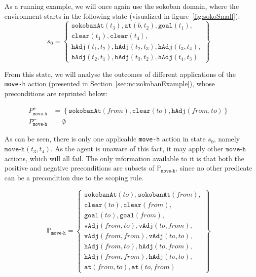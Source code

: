 \documentclass[../Master.tex]{subfiles}
\begin{document}
\begin{example}\label{ex:ncp:sokobanSetup}
    As a running example, we will once again use the sokoban domain, where the environment starts in the following state (visualized in figure~\ref{fig:sokoSmall}):
    \begin{equation*}
        s_0 =
        \left\{
            \begin{gathered}
                \texttt{sokobanAt}(t_3), \texttt{at}(b, t_2), \texttt{goal}(t_1), \\
                \texttt{clear}(t_1), \texttt{clear}(t_4), \\
                \texttt{hAdj}(t_1, t_2), \texttt{hAdj}(t_2, t_3),
                \texttt{hAdj}(t_3, t_4), \\
                \texttt{hAdj}(t_2, t_1), \texttt{hAdj}(t_3, t_2),
                \texttt{hAdj}(t_4, t_3)
            \end{gathered}
        \right\}
    \end{equation*}

    From this state, we will analyse the outcomes of different applications of the \texttt{move-h} action (presented in Section~\ref{sec:nc:sokobanExample}), whose preconditions are reprinted below:

    \begin{align*}
        P_{\texttt{move-h}}^+ &= \left\{
            \texttt{sokobanAt}(from), \texttt{clear}(to), \texttt{hAdj}(from, to)
            \right\} \\
        P_{\texttt{move-h}}^- &= \emptyset
    \end{align*}

    As can be seen, there is only one applicable \texttt{move-h} action in state $s_0$, namely $\texttt{move-h}(t_3,t_4)$. As the agent is unaware of this fact, it may apply other $\texttt{move-h}$ actions, which will all fail. The only information available to it is that both the positive and negative preconditions are subsets of $\mathbb{P}_{\texttt{move-h}}$, since no other predicate can be a precondition due to the scoping rule.

    \begin{equation*}
    \mathbb{P}_{\texttt{move-h}} =
    \left\{
        \begin{gathered}
            \texttt{sokobanAt}(to), \texttt{sokobanAt}(from), \\
            \texttt{clear}(to), \texttt{clear}(from), \\
            \texttt{goal}(to), \texttt{goal}(from), \\
            \texttt{vAdj}(from, to), \texttt{vAdj}(to, from), \\
            \texttt{vAdj}(from, from), \texttt{vAdj}(to, to), \\
            \texttt{hAdj}(from, to), \texttt{hAdj}(to, from), \\
            \texttt{hAdj}(from, from), \texttt{hAdj}(to, to), \\
            \texttt{at}(from, to), \texttt{at}(to, from)
        \end{gathered}
    \right\}
    \end{equation*}
\end{example}
\end{document}
